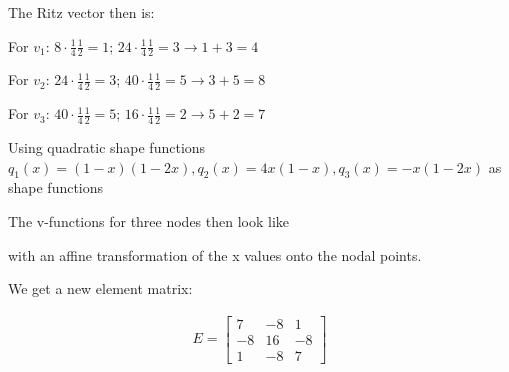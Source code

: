 The Ritz vector then is:

For $v_1$: $8\cdot\frac{1}{4}\frac{1}{2} = 1$; $24\cdot \frac{1}{4}\frac{1}{2} = 3\rightarrow 1+3=4$

For $v_2$: $24\cdot\frac{1}{4}\frac{1}{2} = 3$; $40\cdot \frac{1}{4}\frac{1}{2} = 5\rightarrow 3+5=8$

For $v_3$: $40\cdot\frac{1}{4}\frac{1}{2} = 5$; $16\cdot \frac{1}{4}\frac{1}{2} = 2\rightarrow 5+2=7$


Using quadratic shape functions $q_1(x) = (1-x)(1-2x), q_2(x) = 4x(1-x), q_3(x) = -x(1-2x)$ as shape functions


The v-functions for three nodes then look like


with an affine transformation of the x values onto the nodal points.

We get a new element matrix:
\begin{snugshade*}
    \begin{align*}
        E = 
        \begin{bmatrix}
            7 & -8 & 1 \\
            -8 & 16 & -8 \\
            1 & -8 & 7
        \end{bmatrix}
    \end{align*}
\end{snugshade*}

